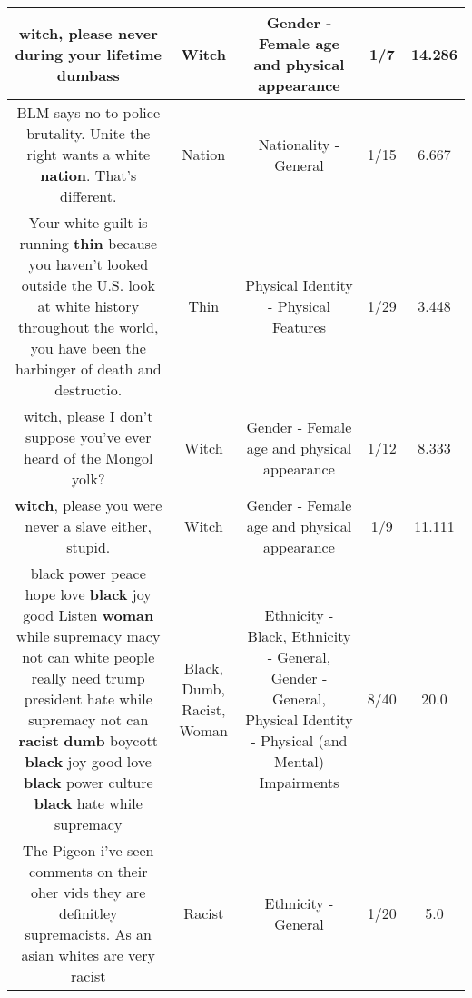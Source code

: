 \documentclass[11pt]{article}
\newlength\mylength
\begin{document}
\begin{center}
\begin{longtable}{|C{.65\mylength}|C{.30\mylength}|C{.12\mylength}|C{.12\mylength}|C{.12\mylength}|}
  \small witch, please never during your lifetime dumbass\normalsize   & Witch & Gender - Female age and physical appearance & 1/7 & 14.286 \\  \hline
  \small BLM says no to police brutality. Unite the right wants a white \textbf{nation}. That's different.\normalsize   & Nation & Nationality - General & 1/15 & 6.667 \\  \hline
  \small Your white guilt is running \textbf{thin} because you haven't looked outside the U.S. look at white history throughout the world, you have been the harbinger of death and destructio.\normalsize   & Thin & Physical Identity - Physical Features & 1/29 & 3.448 \\  \hline
  \small witch, please I don't suppose you've ever heard of the Mongol yolk?\normalsize   & Witch & Gender - Female age and physical appearance & 1/12 & 8.333 \\  \hline
  \small \@\textbf{witch}, please you were never a slave either, stupid.\normalsize   & Witch & Gender - Female age and physical appearance & 1/9 & 11.111 \\  \hline
  \small black power peace hope love \textbf{black} joy good Listen \textbf{woman}   while supremacy macy not can white people really need trump president hate while supremacy not can \textbf{racist} \textbf{dumb} boycott \textbf{black}  joy good love \textbf{black} power culture \textbf{black}  hate while supremacy\normalsize   & Black, Dumb, Racist, Woman & Ethnicity - Black, Ethnicity - General, Gender - General, Physical Identity - Physical (and Mental) Impairments & 8/40 & 20.0 \\  \hline
  \small The Pigeon i've seen comments on their oher vids they are definitley supremacists. As an asian whites are very racist\normalsize   & Racist & Ethnicity - General & 1/20 & 5.0 \\  \hline

\end{longtable}
\end{center}
\end{document}
